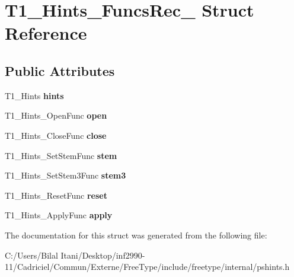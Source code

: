 \hypertarget{struct_t1___hints___funcs_rec__}{}\section{T1\+\_\+\+Hints\+\_\+\+Funcs\+Rec\+\_\+ Struct Reference}
\label{struct_t1___hints___funcs_rec__}
\subsection*{Public Attributes}
\begin{DoxyCompactItemize}
\item 
T1\+\_\+\+Hints {\bfseries hints}\hypertarget{struct_t1___hints___funcs_rec___a6a58f489e362b746703b4caae91349ef}{}\label{struct_t1___hints___funcs_rec___a6a58f489e362b746703b4caae91349ef}

\item 
T1\+\_\+\+Hints\+\_\+\+Open\+Func {\bfseries open}\hypertarget{struct_t1___hints___funcs_rec___a41ca09a042c8e92f64822f19486a622a}{}\label{struct_t1___hints___funcs_rec___a41ca09a042c8e92f64822f19486a622a}

\item 
T1\+\_\+\+Hints\+\_\+\+Close\+Func {\bfseries close}\hypertarget{struct_t1___hints___funcs_rec___aa6d879215bff42f4b3851a9151c78505}{}\label{struct_t1___hints___funcs_rec___aa6d879215bff42f4b3851a9151c78505}

\item 
T1\+\_\+\+Hints\+\_\+\+Set\+Stem\+Func {\bfseries stem}\hypertarget{struct_t1___hints___funcs_rec___abdbf955a1fc9b19799ed8ea8137c9381}{}\label{struct_t1___hints___funcs_rec___abdbf955a1fc9b19799ed8ea8137c9381}

\item 
T1\+\_\+\+Hints\+\_\+\+Set\+Stem3\+Func {\bfseries stem3}\hypertarget{struct_t1___hints___funcs_rec___acc1edae831d279929f93c8eb1872daa3}{}\label{struct_t1___hints___funcs_rec___acc1edae831d279929f93c8eb1872daa3}

\item 
T1\+\_\+\+Hints\+\_\+\+Reset\+Func {\bfseries reset}\hypertarget{struct_t1___hints___funcs_rec___a5646878cdabd593389e28cffd8b077cb}{}\label{struct_t1___hints___funcs_rec___a5646878cdabd593389e28cffd8b077cb}

\item 
T1\+\_\+\+Hints\+\_\+\+Apply\+Func {\bfseries apply}\hypertarget{struct_t1___hints___funcs_rec___a3fb5f01de31da9efb2ae8f5251b4d506}{}\label{struct_t1___hints___funcs_rec___a3fb5f01de31da9efb2ae8f5251b4d506}

\end{DoxyCompactItemize}


The documentation for this struct was generated from the following file\+:\begin{DoxyCompactItemize}
\item 
C\+:/\+Users/\+Bilal Itani/\+Desktop/inf2990-\/11/\+Cadriciel/\+Commun/\+Externe/\+Free\+Type/include/freetype/internal/pshints.\+h\end{DoxyCompactItemize}
